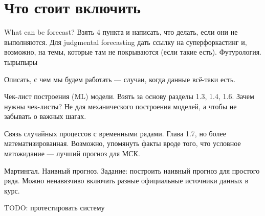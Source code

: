 \section{Что стоит включить}

What can be forecast? Взять 4 пункта и написать, что делать, если они
не выполняются. Для judgmental forecasting дать ссылку на
суперфоркастинг и, возможно, на темы, которые там не покрываются
(если такие есть). Футурология. тырыпыры

Описать, с чем мы будем работать — случаи, когда данные всё-таки есть.

Чек-лист построения (ML) модели. Взять за основу разделы 1.3, 1.4,
1.6. Зачем нужны чек-листы? Не для механического построения моделей,
а чтобы не забывать о важных шагах.

Связь случайных процессов с временными рядами. Глава 1.7, но более
математизированная. Возможно, упомянуть факты вроде того, что
условное матожидание — лучший прогноз для МСК.

Мартингал. Наивный прогноз.
Задание: построить наивный прогноз для простого ряда. Можно
ненавязчиво включать разные официальные источники данных в курс.

TODO: протестировать систему
